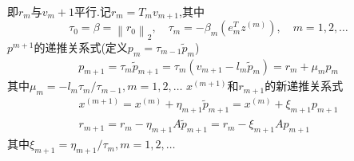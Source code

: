 \documentclass[12pt,a4paper]{article}
\begin{document}
即$r_m$与$v_m+1$平行.记{\color{blue}$r_{m}=T_{m} v_{m+1}$},其中
$$
\tau_{0}=\beta=\left\|r_{0}\right\|_{2}, \quad \tau_{m}=-\beta_{m}\left(e_{m}^{T} z^{(m)}\right), \quad m=1,2, \ldots
$$
{\color{blue}$p^{m+1}$的递推关系式}(定义$p_{m}=\tau_{m-1} \tilde{p}_{m}$)
\begin{align*}
	p_{m+1}=\tau_{m} \tilde{p}_{m+1}=\tau_{m}\left(v_{m+1}-l_{m} \tilde{p}_{m}\right)=r_{m}+\mu_{m} p_{m}
	\tag{7.10}
\end{align*}
其中$\mu_{m}=-l_{m} \tau_{m} / \tau_{m-1}, m=1,2, \ldots$
{\color{blue}$x^{(m+1)}$和$r_{m+1}$的新递推关系式}
\begin{align*}
	x^{(m+1)}=x^{(m)}+\eta_{m+1} \tilde{p}_{m+1}=x^{(m)}+\xi_{m+1} p_{m+1}\tag{7.11}\\
	r_{m+1}=r_{m}-\eta_{m+1} A \tilde{p}_{m+1}=r_{m}-\xi_{m+1} A p_{m+1}
	\tag{7.12}
\end{align*}
其中$\xi_{m+1}=\eta_{m+1} / \tau_{m}, m=1,2, \ldots$
\end{document}
